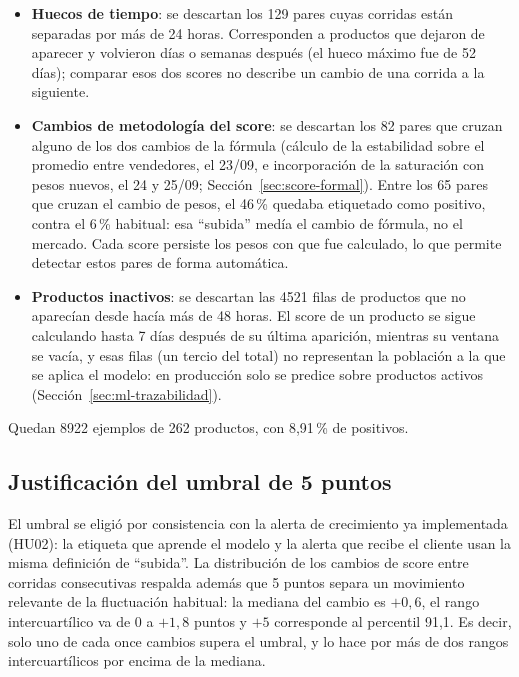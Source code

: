 \begin{itemize}
	\item \textbf{Huecos de tiempo}: se descartan los 129 pares cuyas corridas están separadas por más de 24 horas. Corresponden a productos que dejaron de aparecer y volvieron días o semanas después (el hueco máximo fue de 52 días); comparar esos dos scores no describe un cambio de una corrida a la siguiente.
	\item \textbf{Cambios de metodología del score}: se descartan los 82 pares que cruzan alguno de los dos cambios de la fórmula (cálculo de la estabilidad sobre el promedio entre vendedores, el 23/09, e incorporación de la saturación con pesos nuevos, el 24 y 25/09; Sección~\ref{sec:score-formal}). Entre los 65 pares que cruzan el cambio de pesos, el 46\,\% quedaba etiquetado como positivo, contra el 6\,\% habitual: esa ``subida'' medía el cambio de fórmula, no el mercado. Cada score persiste los pesos con que fue calculado, lo que permite detectar estos pares de forma automática.
	\item \textbf{Productos inactivos}: se descartan las 4521 filas de productos que no aparecían desde hacía más de 48 horas. El score de un producto se sigue calculando hasta 7 días después de su última aparición, mientras su ventana se vacía, y esas filas (un tercio del total) no representan la población a la que se aplica el modelo: en producción solo se predice sobre productos activos (Sección~\ref{sec:ml-trazabilidad}).
\end{itemize}

Quedan 8922 ejemplos de 262 productos, con 8,91\,\% de positivos.

\subsection*{Justificación del umbral de 5 puntos}

El umbral se eligió por consistencia con la alerta de crecimiento ya implementada (HU02): la etiqueta que aprende el modelo y la alerta que recibe el cliente usan la misma definición de ``subida''. La distribución de los cambios de score entre corridas consecutivas respalda además que 5 puntos separa un movimiento relevante de la fluctuación habitual: la mediana del cambio es $+0{,}6$, el rango intercuartílico va de $0$ a $+1{,}8$ puntos y $+5$ corresponde al percentil 91,1. Es decir, solo uno de cada once cambios supera el umbral, y lo hace por más de dos rangos intercuartílicos por encima de la mediana.

